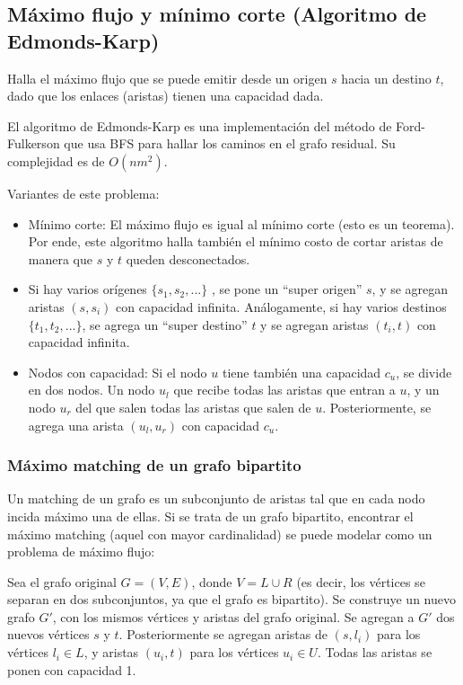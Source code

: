 \documentclass{article}
\begin{document}
\begin{multicols}{2}
	\subsection{Máximo flujo y mínimo corte (Algoritmo de Edmonds-Karp)}
	Halla el máximo flujo que se puede emitir desde un origen \( s \) hacia un destino \( t \), dado que los enlaces (aristas) tienen una capacidad dada.
	
	El algoritmo de Edmonds-Karp es una implementación del método de Ford-Fulkerson que usa BFS para hallar los caminos en el grafo residual. Su complejidad es de \( O(nm^2) \).
	
	Variantes de este problema:	
	
	\begin{itemize}
		\item Mínimo corte: El máximo flujo es igual al mínimo corte (esto es un teorema). Por ende, este algoritmo halla también el mínimo costo de cortar aristas de manera que \( s \) y \( t \) queden desconectados.
		\item Si hay varios orígenes \( \{s_1, s_2, ...\} \) , se pone un ``super origen'' \( s \), y se agregan aristas \( (s, s_i) \) con capacidad infinita. Análogamente, si hay varios destinos \( \{t_1, t_2, ...\} \), se agrega un ``super destino'' \( t \) y se agregan aristas \( (t_i, t) \) con capacidad infinita.
		\item Nodos con capacidad: Si el nodo \( u \) tiene también una capacidad \( c_u \), se divide en dos nodos. Un nodo \( u_l\) que recibe todas las aristas que entran a \( u \), y un nodo \( u_r \) del que salen todas las aristas que salen de \( u \). Posteriormente, se agrega una arista \( (u_l, u_r) \) con capacidad \( c_u \).
	\end{itemize}
	
	
	
	\subsubsection{Máximo matching de un grafo bipartito}
	Un matching de un grafo es un subconjunto de aristas tal que en cada nodo incida máximo una de ellas. Si se trata de un grafo bipartito, encontrar el máximo matching (aquel con mayor cardinalidad) se puede modelar como un problema de máximo flujo: 
	
	Sea el grafo original \( G = (V, E) \), donde \( V = L \cup R \) (es decir, los vértices se separan en dos subconjuntos, ya que el grafo es bipartito). Se construye un nuevo grafo \( G' \), con los mismos vértices y aristas del grafo original. Se agregan a \( G' \) dos nuevos vértices \( s \) y \( t \). Posteriormente se agregan aristas de \( (s, l_i) \) para los vértices \( l_i  \in L \), y aristas \( (u_i, t) \) para los vértices \( u_i \in U \). Todas las aristas se ponen con capacidad 1.
	

\end{multicols}
\end{document}
